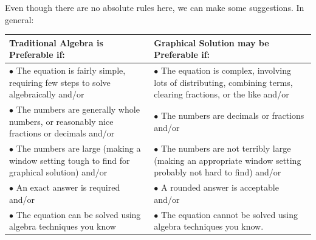 Even though there are no absolute rules here, we can make some suggestions. In general:\\
\bigskip

\begin{tabular}{|p{}|p{}|}
	\hline
	Traditional Algebra is Preferable if: & Graphical Solution may be Preferable if:\\
	\hline
	$\bullet$ The equation is fairly simple, requiring few steps to solve algebraically and/or & $\bullet$ The equation is complex, involving lots of distributing, combining terms, clearing fractions, or the like and/or\\
	$\bullet$ The numbers are generally whole numbers, or reasonably nice fractions or decimals and/or & $\bullet$ The numbers are \quotes{messy} decimals or fractions and/or \\
	$\bullet$ The numbers are large (making a window setting tough to find for graphical solution) and/or & $\bullet$ The numbers are not terribly large (making an appropriate window setting probably not hard to find) and/or \\
	$\bullet$ An exact answer is required and/or & $\bullet$ A rounded answer is acceptable and/or \\
	$\bullet$ The equation can be solved using algebra techniques you know & $\bullet$ The equation cannot be solved using algebra techniques you know.\\
	\hline
\end{tabular}


